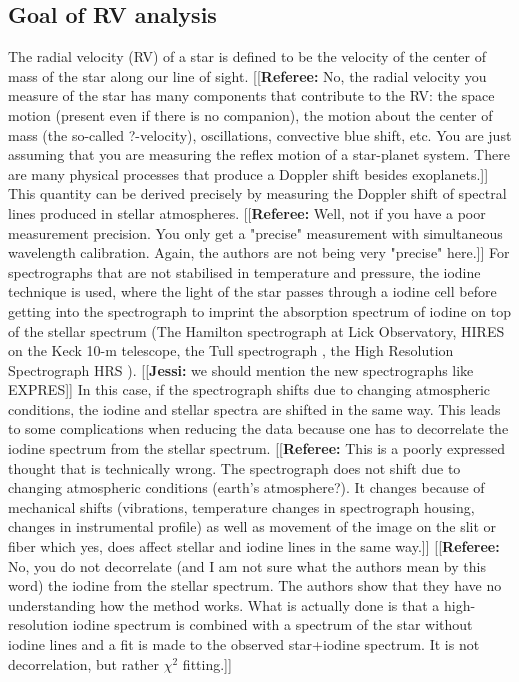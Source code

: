 \documentclass[11pt, oneside]{article}
\newcommand{\jessi}[1]{{\color{Purple}[[\textbf{Jessi: }#1]]}}
\newcommand{\comment}[1]{{\color{red}[[\textbf{Referee: }#1]]}}
\begin{document}
\subsection{Goal of RV analysis}
The radial velocity (RV) of a star is defined to be the velocity of the center of mass of the star along our line of sight. 
\comment{No, the radial velocity you measure of the star has many components that contribute to the RV: the space motion (present even if there is no companion), the motion about the center of mass (the so-called ?-velocity), oscillations, convective blue shift, etc.
You are just assuming that you are measuring the reflex motion of a star-planet system. There are many physical processes that produce a Doppler shift besides exoplanets.}
This quantity can be derived precisely by measuring the Doppler shift of spectral lines produced in stellar atmospheres. 
\comment{Well, not if you have a poor measurement precision. You only get a "precise" measurement with simultaneous wavelength calibration. Again, the authors are not being very "precise" here.}
For spectrographs that are not stabilised in temperature and pressure, the iodine technique is used, where the light of the star passes through a iodine cell before getting into the spectrograph to imprint the absorption spectrum of iodine on top of the stellar spectrum (The Hamilton spectrograph \citep{Vogt1987} at Lick Observatory, HIRES \citep{Vogt1994} on the Keck 10-m telescope, the Tull spectrograph  \citep{Tull1995}, the High Resolution Spectrograph HRS  \citep{Tull1998}). 
\jessi{we should mention the new spectrographs like EXPRES}
In this case, if the spectrograph shifts due to changing atmospheric conditions, the iodine and stellar spectra are shifted in the same way. This leads to some complications when reducing the data because one has to decorrelate the iodine spectrum from the stellar spectrum. 
\comment{This is a poorly expressed thought that is technically wrong. The spectrograph does not shift due to changing atmospheric conditions (earth's atmosphere?). It changes because of mechanical shifts (vibrations, temperature changes in spectrograph housing, changes in instrumental profile) as well as movement of the image on the slit or fiber which yes, does affect stellar and iodine lines in the same way.}  
\comment{No, you do not decorrelate (and I am not sure what the authors mean by this word) the iodine from the stellar spectrum. The authors show that they have no understanding how the method works. What is actually done is that a high-resolution iodine spectrum is combined with a spectrum of the star without iodine lines and a fit is made to the observed star+iodine spectrum. It is not decorrelation, but rather $\chi^2$ fitting.}
\end{document}
